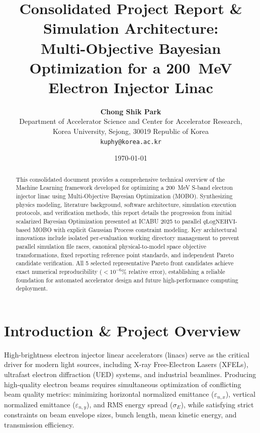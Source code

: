 \documentclass[11pt,a4paper]{article}
\title{\textbf{Consolidated Project Report \& Simulation Architecture:\\ Multi-Objective Bayesian Optimization for a 200~MeV Electron Injector Linac}}
\author{\textbf{Chong Shik Park}\\
    Department of Accelerator Science and Center for Accelerator Research, \\
    Korea University, Sejong, 30019 Republic of Korea\\
    \texttt{kuphy@korea.ac.kr}
}
\date{\today}
\begin{document}
\maketitle

\begin{abstract}
This consolidated document provides a comprehensive technical overview of the Machine Learning framework developed for optimizing a 200~MeV S-band electron injector linac using Multi-Objective Bayesian Optimization (MOBO). Synthesizing physics modeling, literature background, software architecture, simulation execution protocols, and verification methods, this report details the progression from initial scalarized Bayesian Optimization presented at ICABU 2025 to parallel $q\text{LogNEHVI}$-based MOBO with explicit Gaussian Process constraint modeling. Key architectural innovations include isolated per-evaluation working directory management to prevent parallel simulation file races, canonical physical-to-model space objective transformations, fixed reporting reference point standards, and independent Pareto candidate verification. All 5 selected representative Pareto front candidates achieve exact numerical reproducibility ($<10^{-6}\%$ relative error), establishing a reliable foundation for automated accelerator design and future high-performance computing deployment.
\end{abstract}

\tableofcontents
\newpage

\section{Introduction \& Project Overview}
\label{sec:introduction}

High-brightness electron injector linear accelerators (linacs) serve as the critical driver for modern light sources, including X-ray Free-Electron Lasers (XFELs), ultrafast electron diffraction (UED) systems, and industrial beamlines. Producing high-quality electron beams requires simultaneous optimization of conflicting beam quality metrics: minimizing horizontal normalized emittance ($\varepsilon_{n,x}$), vertical normalized emittance ($\varepsilon_{n,y}$), and RMS energy spread ($\sigma_E$), while satisfying strict constraints on beam envelope sizes, bunch length, mean kinetic energy, and transmission efficiency.
\end{document}
